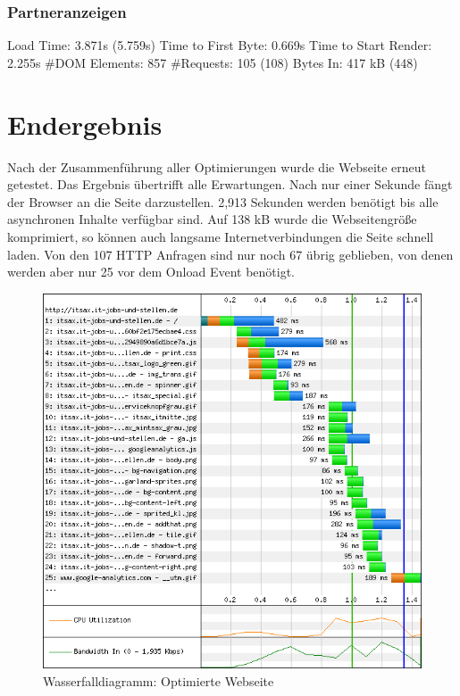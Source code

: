 \subsubsection{Partneranzeigen}
Load Time: 3.871s (5.759s)
Time to First Byte: 0.669s %
Time to Start Render: 2.255s
\#DOM Elements: 857 
\#Requests: 105 (108)
Bytes In: 417 kB (448)


\section{Endergebnis} 
Nach der Zusammenführung aller Optimierungen wurde die Webseite erneut getestet. Das Ergebnis übertrifft alle Erwartungen. Nach nur einer Sekunde fängt der Browser an die Seite darzustellen. 2,913 Sekunden werden benötigt bis alle asynchronen Inhalte verfügbar sind. Auf 138 kB wurde die Webseitengröße komprimiert, so können auch langsame Internetverbindungen die Seite schnell laden. Von den 107 HTTP Anfragen sind nur noch 67 übrig geblieben, von denen werden aber nur 25 vor dem Onload Event benötigt. 
\begin{figure}[htbp]
  \centering
  \includegraphics[scale=0.5]{material/end_waterfall.png}
  \caption{Wasserfalldiagramm: Optimierte Webseite}
  \label{fig:endwaterfall}
\end{figure}
